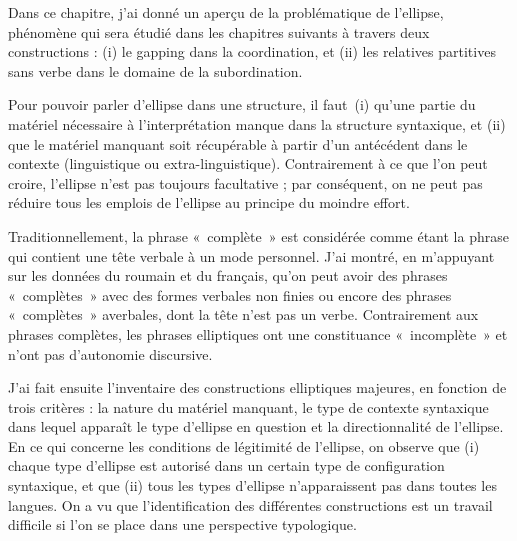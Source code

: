 Dans ce chapitre, j’ai donné un aperçu de la problématique de l’ellipse, phéno\-mène qui sera étudié dans les chapitres suivants à travers deux constructions : (i) le gapping dans la coordination, et (ii) les relatives partitives sans verbe dans le domaine de la subordination. 

Pour pouvoir parler d’ellipse dans une structure, il faut~(i) qu’une partie du matériel nécessaire à l’interprétation manque dans la structure syntaxique, et (ii) que le matériel manquant soit récupérable à partir d’un antécédent dans le contexte (linguistique ou extra-linguistique). Contrairement à ce que l’on peut croire, l’ellipse n’est pas toujours facultative ; par conséquent, on ne peut pas réduire tous les emplois de l’ellipse au principe du moindre effort.  

Traditionnellement, la phrase «~complète~» est considérée comme étant la phrase qui contient une tête verbale à un mode personnel. J’ai montré, en m’appu\-yant sur les données du roumain et du français, qu’on peut avoir des phrases «~complètes~» avec des formes verbales non finies ou encore des phrases «~complètes~» averbales, dont la tête n’est pas un verbe. Contrairement aux phrases complètes, les phrases elliptiques ont une constituance «~incomplète~» et n’ont pas d’autono\-mie discursive.

J’ai fait ensuite l’inventaire des constructions elliptiques majeures, en fonction de trois critères : la nature du matériel manquant, le type de contexte syntaxique dans lequel apparaît le type d’ellipse en question et la directionnalité de l’ellipse. En ce qui concerne les conditions de légitimité de l’ellipse, on observe que (i) chaque type d’ellipse est autorisé dans un certain type de configuration syntaxique, et que (ii) tous les types d’ellipse n’apparaissent pas dans toutes les langues. On a vu que l’identification des différentes constructions est un travail difficile si l’on se place dans une perspective typologique.  

